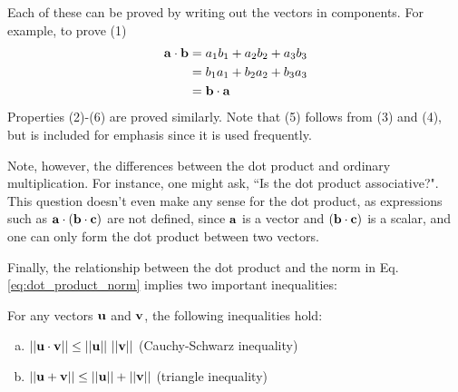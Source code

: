 \documentclass[12pt,letterpaper,reqno]{article}
\numberwithin{equation}{section}
\newcommand{\fixme}[1]{{\color{orange}{[#1]}}}
\begin{document}
\begin{pf}
Each of these can be proved by writing out the vectors in components. For example, to prove (1)
\begin{align*}
	{\bf a}\cdot {\bf b}&=a_1b_1+a_2b_2+a_3b_3 \\
	&=b_1a_1+b_2a_2+b_3a_3 \\
	&={\bf b}\cdot {\bf a}
\end{align*}
Properties (2)-(6) are proved similarly. Note that (5) follows from (3) and (4), but is included for emphasis since it is used frequently. 	
\end{pf}

\fixme{Add exercises using these properties.}

Note, however, the differences between the dot product and ordinary multiplication. For instance, one might ask, ``Is the dot product associative?". This question doesn't even make any sense for the dot product, as expressions such as ${\bf a}\cdot ({\bf b}\cdot {\bf c})$ are not defined, since ${\bf a}$ is a vector and $({\bf b}\cdot {\bf c})$ is a scalar, and one can only form the dot product between two vectors. 


Finally, the relationship between the dot product and the norm in Eq. \eqref{eq:dot_product_norm} implies two important inequalities:

\begin{prop}
For any vectors ${\bf u}$ and ${\bf v}$, the following inequalities hold:
\begin{enumerate}[(a)]
	\item $||{\bf u}\cdot {\bf v}|| \leq ||{\bf u}|| \ ||{\bf v}||$ (Cauchy-Schwarz inequality)
		\item $||{\bf u}+{\bf v}||\leq ||{\bf u}|| + ||{\bf v}||$ (triangle inequality) 
\end{enumerate}
\end{prop}
\end{document}
